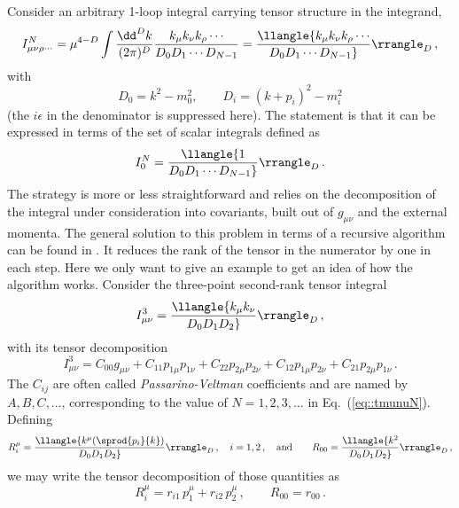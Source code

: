 Consider an arbitrary 1-loop integral carrying tensor
structure in the integrand,
\begin{equation}\label{eq::tmunuN}
  I_{\mu\nu\rho\cdots}^N = \mu^{4-D} \int{\dd^D k\over (2\pi)^D}{k_\mu
    k_\nu k_\rho \cdots \over D_0 D_1\cdots D_{N-1}} =
\llangle{k_\mu k_\nu k_\rho \cdots \over D_0 D_1\cdots D_{N-1}}\rrangle_D\,,
\end{equation}
with
\begin{equation}\label{eq::Dnotation}
D_0 = k^2 - m_0^2, \qquad D_i = (k+p_i)^2 - m_i^2
\end{equation}
(the $i\epsilon$ in the denominator is suppressed here).  The statement
is \cite{PasVel79} that it can be expressed in terms of the set of
scalar integrals defined as
\begin{equation}\label{eq::scalint}
I_0^N = \llangle{1\over D_0 D_1\cdots D_{N-1}}\rrangle_D\,.
\end{equation}
The strategy is more or less straightforward and relies on the
decomposition of the integral under consideration into covariants, built
out of $g_{\mu\nu}$ and the external momenta. The general solution to
this problem in terms of a recursive algorithm can be found in
\cite{Denner:habil}. It reduces the rank of the tensor in the numerator
by one in each step. Here we only want to give an example to get an idea
of how the algorithm works.
%
Consider the three-point second-rank tensor integral
%
\begin{equation}\label{eq::tmunu3}
I^3_{\mu\nu} = \llangle {k_\mu k_\nu\over D_0 D_1 D_2} \rrangle_D\,,
\end{equation}
%
with its tensor decomposition
%
\begin{equation}\label{eq::tensdec}
I^3_{\mu\nu} = C_{00} g_{\mu\nu} +
C_{11} p_{1\mu} p_{1\nu} + C_{22} p_{2\mu} p_{2\nu} + C_{12} p_{1\mu} p_{2\nu}
+ C_{21} p_{2\mu} p_{1\nu}\,.
\end{equation}
The $C_{ij}$ are often called {\it Passarino-Veltman} coefficients and
are named by $A,B,C,\ldots$, corresponding to the value of $N=1,2,3,\ldots$ in
Eq.~(\ref{eq::tmunuN}).
%
Defining
%
\begin{equation}\label{eq::rimu}
R_i^\mu = \llangle{k^\mu(\sprod{p_i}{k})\over D_0 D_1 D_2}\rrangle_D\,,\quad
  i=1,2\,,\quad \mbox{and}\qquad R_{00} = \llangle {k^2\over D_0 D_1
  D_2}\rrangle_D\,,
\end{equation}
%
we may write the tensor decomposition of those quantities as
%
\begin{equation}\label{eq::Rtensdec}
R_i^\mu = r_{i1}\, p_1^\mu + r_{i2}\, p_2^\mu\,,\qquad R_{00} = r_{00}\,.
\end{equation}
